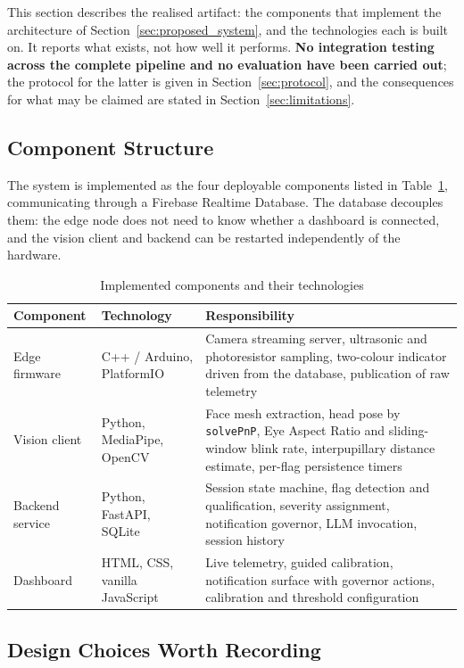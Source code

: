 This section describes the realised artifact: the components that implement the architecture of
Section~\ref{sec:proposed_system}, and the technologies each is built on. It reports what exists,
not how well it performs. \textbf{No integration testing across the complete pipeline and no
evaluation have been carried out}; the protocol for the latter is given in
Section~\ref{sec:protocol}, and the consequences for what may be claimed are stated in
Section~\ref{sec:limitations}.

\subsection{Component Structure}

The system is implemented as the four deployable components listed in
Table~\ref{tab:components}, communicating through a Firebase Realtime Database. The database
decouples them: the edge node does not need to know whether a dashboard is connected, and the
vision client and backend can be restarted independently of the hardware.

\begin{table}[htbp]
\centering
\caption{Implemented components and their technologies}
\label{tab:components}
\begin{tabular}{@{}llp{6.2cm}@{}}
\toprule
\textbf{Component} & \textbf{Technology} & \textbf{Responsibility} \\
\midrule
Edge firmware
& C++ / Arduino, PlatformIO
& Camera streaming server, ultrasonic and photoresistor sampling, two-colour indicator driven from
the database, publication of raw telemetry \\
\addlinespace
Vision client
& Python, MediaPipe, OpenCV
& Face mesh extraction, head pose by \texttt{solvePnP}, Eye Aspect Ratio and sliding-window blink
rate, interpupillary distance estimate, per-flag persistence timers \\
\addlinespace
Backend service
& Python, FastAPI, SQLite
& Session state machine, flag detection and qualification, severity assignment, notification
governor, LLM invocation, session history \\
\addlinespace
Dashboard
& HTML, CSS, vanilla JavaScript
& Live telemetry, guided calibration, notification surface with governor actions, calibration and
threshold configuration \\
\bottomrule
\end{tabular}
\end{table}

\subsection{Design Choices Worth Recording}

